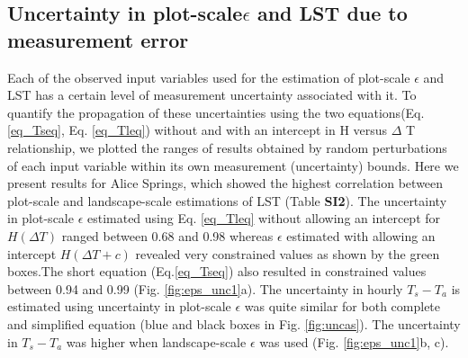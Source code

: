 \documentclass[fleqn,10pt]{wlscirep}
\begin{document}
\subsection{Uncertainty in plot-scale$\epsilon$ and LST due to measurement error}
Each of the observed input variables used for the estimation of plot-scale $\epsilon$ and LST has a certain level of measurement uncertainty associated with it. To quantify the propagation of these uncertainties using the two equations(Eq. \ref{eq_Tseq}, Eq. \ref{eq_Tleq}) without and with an intercept in H versus $\Delta$ T relationship, we plotted the ranges of results obtained by random perturbations of each input variable within its own measurement (uncertainty) bounds. Here we present results for Alice Springs, which showed the highest correlation between plot-scale and landscape-scale estimations of LST (Table \textbf{SI2}). 
The uncertainty in plot-scale $\epsilon$ estimated using Eq. \ref{eq_Tleq}  without allowing an intercept for $H(\Delta  T)$ ranged between 0.68 and 0.98 whereas $\epsilon$ estimated with allowing an intercept
$H(\Delta  T+c)$ revealed very constrained values as shown by the green boxes.The short equation (Eq.\ref{eq_Tseq}) also resulted in constrained values between 0.94 and 0.99 (Fig. \ref{fig:eps_unc1}a). The uncertainty in hourly $T_{s} - T_{a}$ is estimated using uncertainty in plot-scale $\epsilon$ was quite similar for both complete and simplified equation (blue and black boxes in Fig. \ref{fig:uncas}). The uncertainty in $T_{s} - T_{a}$ was higher when landscape-scale $\epsilon$ was used (Fig. \ref{fig:eps_unc1}b, c).
 
\end{document}
